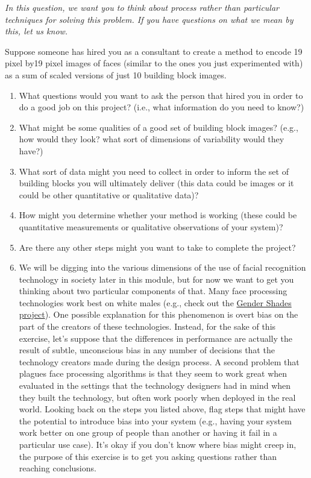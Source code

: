 \begin{prob}
\emph{In this question, we want you to think about process rather than particular techniques for solving this problem.  If you have questions on what we mean by this, let us know.}

Suppose someone has hired you as a consultant to create a method to encode 19 pixel by19 pixel images of faces (similar to the ones you just experimented with) as a sum of scaled versions of just 10 building block images.

\begin{enumerate}
\item What questions would you want to ask the person that hired you in order to do a good job on this project? (i.e., what information do you need to know?)
\item What might be some qualities of a good set of building block images?  (e.g., how would they look?  what sort of dimensions of variability would they have?)
\item What sort of data might you need to collect in order to inform the set of building blocks you will ultimately deliver (this data could be images or it could be other quantitative or qualitative data)?
\item How might you determine whether your method is working (these could be quantitative measurements or qualitative observations of your system)?
\item Are there any other steps might you want to take to complete the project?
\item We will be digging into the various dimensions of the use of facial recognition technology in society later in this module, but for now we want to get you thinking about two particular components of that.  Many face processing technologies work best on white males (e.g., check out the \href{http://gendershades.org/overview.html}{Gender Shades project}).  One possible explanation for this phenomenon is overt bias on the part of the creators of these technologies.  Instead, for the sake of this exercise, let's suppose that the differences in performance are actually the result of subtle, unconscious bias in any number of decisions that the technology creators made during the design process.  A second problem that plagues face processing algorithms is that they seem to work great when evaluated in the settings that the technology designers had in mind when they built the technology, but often work poorly when deployed in the real world.  Looking back on the steps you listed above, flag steps that might have the potential to introduce bias into your system (e.g., having your system work better on one group of people than another or having it fail in a particular use case).  It's okay if you don't know where bias might creep in, the purpose of this exercise is to get you asking questions rather than reaching conclusions.
\end{enumerate}

\end{prob}

